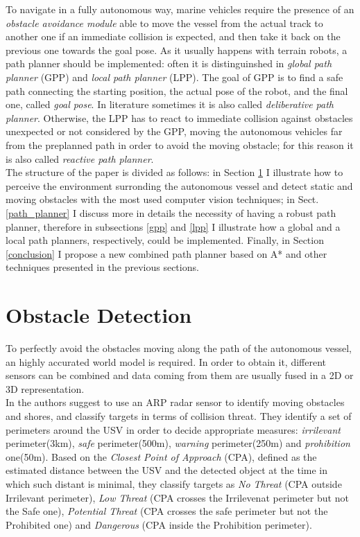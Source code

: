 \documentclass[journal]{IEEEtran}
\begin{document}
      \indent To navigate in a fully autonomous way, marine vehicles require the presence of an \textit{obstacle avoidance module} able to move the vessel from the actual track to another one if an immediate collision is expected, and then take it back on the previous one towards the goal pose. As it usually happens with terrain robots, a path planner should be implemented: often it is distinguinshed in \textit{global path planner} (GPP) and \textit{local path planner} (LPP). The goal of GPP is to find a safe path connecting the starting position, the actual pose of the robot, and the final one, called \textit{goal pose}. In literature sometimes it is also called \textit{deliberative path planner}. Otherwise, the LPP has to react to immediate collision against obstacles unexpected or not considered by the GPP, moving the autonomous vehicles far from the preplanned path in order to avoid the moving obstacle; for this reason it is also called \textit{reactive path planner}.\\
      \indent The structure of the paper is divided as follows: in Section \ref{obs_det} I illustrate how to perceive the environment surronding the autonomous vessel and detect static and moving obstacles with the most used computer vision techniques; in Sect. \ref{path_planner} I discuss more in details the necessity of having a robust path planner, therefore in subsections \ref{gpp} and \ref{lpp} I illustrate how a global and a local path planners, respectively, could be implemented. Finally, in Section \ref{conclusion} I propose a new combined path planner based on A* and other techniques presented in the previous sections.


\section{Obstacle Detection} \label{obs_det}

      \indent To perfectly avoid the obstacles moving along the path of the autonomous vessel, an highly accurated world model is required. In order to obtain it, different sensors can be combined and data coming from them are usually fused in a 2D or 3D representation.\\

      \indent In \cite{Almeida2009} the authors suggest to use an ARP radar sensor to identify moving obstacles and shores, and classify targets in terms of collision threat. They identify a set of perimeters around the USV in order to decide appropriate measures: \textit{irrilevant} perimeter(3km), \textit{safe} perimeter(500m), \textit{warning} perimeter(250m) and \textit{prohibition} one(50m). Based on the \textit{Closest Point of Approach} (CPA), defined as the estimated distance between the USV and the detected object at the time in which such distant is minimal, they classify targets as \textit{No Threat} (CPA outside Irrilevant perimeter), \textit{Low Threat} (CPA crosses the Irrilevenat perimeter but not the Safe one), \textit{Potential Threat} (CPA crosses the safe perimeter but not the Prohibited one) and \textit{Dangerous} (CPA inside the Prohibition perimeter).\\
\end{document}
